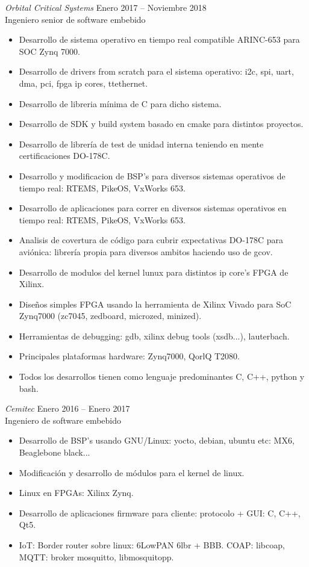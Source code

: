 \documentclass[10pt]{res} %
\begin{document}
\begin{resume}
{\sl Orbital Critical Systems} \hfill Enero 2017 -- Noviembre 2018\\
\hfill Ingeniero senior de software embebido
\begin{itemize} \itemsep -2pt %
\item Desarrollo de sistema operativo en tiempo real compatible ARINC-653 para SOC Zynq 7000.
\item Desarrollo de drivers from scratch para el sistema operativo: i2c, spi, uart, dma, pci, fpga ip cores, ttethernet.
\item Desarrollo de libreria mínima de C para dicho sistema.
\item Desarrollo de SDK y build system basado en cmake para distintos proyectos.
\item Desarrollo de librería de test de unidad interna teniendo en mente certificaciones DO-178C.
\item Desarrollo y modificacion de BSP's para diversos sistemas operativos de tiempo real: RTEMS, PikeOS, VxWorks 653.
\item Desarrollo de aplicaciones para correr en diversos sistemas operativos en tiempo real: RTEMS, PikeOS, VxWorks 653.
\item Analisis de covertura de código para cubrir expectativas DO-178C para aviónica: librería propia para diversos ambitos haciendo uso de gcov.
\item Desarrollo de modulos del kernel lunux para distintos ip core's FPGA de Xilinx.
\item Diseños simples FPGA usando la herramienta de Xilinx Vivado para SoC Zynq7000 (zc7045, zedboard, microzed, minized).
\item Herramientas de debugging: gdb, xilinx debug tools (xsdb...), lauterbach.
\item Principales plataformas hardware: Zynq7000, QorlQ T2080.
\item Todos los desarrollos tienen como lenguaje predominantes C, C++, python y bash. 
\end{itemize}

{\sl Cemitec} \hfill Enero 2016 -- Enero 2017\\
\hfill Ingeniero de software embebido
\begin{itemize} \itemsep -2pt %
\item Desarrollo de BSP's usando GNU/Linux: yocto, debian, ubuntu etc: MX6, Beaglebone black...
\item Modificación y desarrollo de módulos para el kernel de linux.
\item Linux en FPGAs: Xilinx Zynq.
\item Desarrollo de aplicaciones firmware para cliente: protocolo + GUI: C, C++, Qt5. 
\item IoT: Border router sobre linux: 6LowPAN 6lbr + BBB. COAP: libcoap, MQTT: broker mosquitto, libmosquitopp.
\end{itemize}


\end{resume}
\end{document}
